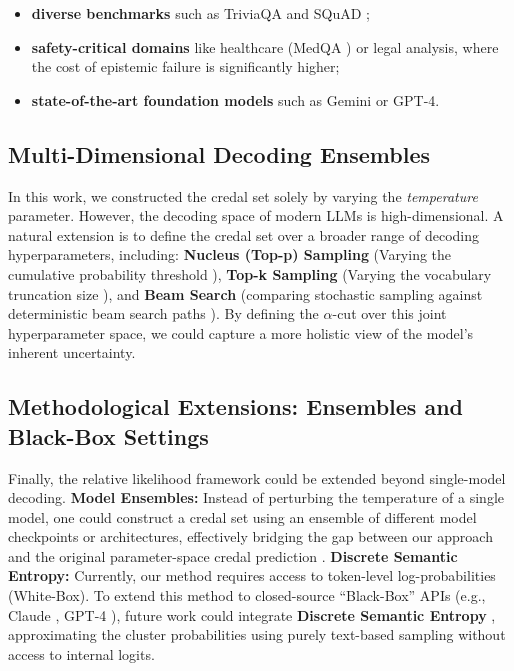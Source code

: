 \begin{itemize}
    \item \textbf{diverse benchmarks} such as TriviaQA 
	\parencite{joshi2017triviaqalargescaledistantly} and 
	SQuAD \parencite{rajpurkar2018knowdontknowunanswerable};
    \item \textbf{safety-critical domains} like healthcare 
	(MedQA \citealp{jin2020diseasedoespatienthave}) or legal 
	analysis, where the cost of epistemic failure is significantly 
	higher;
    \item \textbf{state-of-the-art foundation models} such as Gemini 
	\parencite{geminiteam2025geminifamilyhighlycapable} or 
	GPT-4.
\end{itemize}

\subsection{Multi-Dimensional Decoding Ensembles}
\label{sec:conclusion:future:decoding}
In this work, we constructed the credal set solely by varying the 
\textit{temperature} parameter. However, the decoding space of modern 
LLMs is high-dimensional. A natural extension is to define the credal 
set over a broader range of decoding hyperparameters, including:
\textbf{Nucleus (Top-p) Sampling} (Varying the cumulative 
probability threshold \parencite{holtzman2020curiouscaseneuraltext}),
\textbf{Top-k Sampling} (Varying the vocabulary truncation size 
\parencite{fan2018hierarchicalneuralstorygeneration}), and
\textbf{Beam Search} (comparing stochastic sampling against deterministic 
beam search paths \parencite{freitag-al-onaizan-2017-beam}).
By defining the $\alpha$-cut over this joint hyperparameter space, we 
could capture a more holistic view of the model's inherent uncertainty.

\subsection{Methodological Extensions: Ensembles and Black-Box Settings}
\label{sec:conclusion:future:black_box}
Finally, the relative likelihood framework could be extended beyond 
single-model decoding.
\textbf{Model Ensembles:} Instead of perturbing the temperature of a 
single model, one could construct a credal set using an ensemble of 
different model checkpoints or architectures, effectively bridging 
the gap between our approach and the original parameter-space credal 
prediction \parencite{löhr2025credalpredictionbasedrelative}.
\textbf{Discrete Semantic Entropy:} Currently, our method requires 
access to token-level log-probabilities (White-Box). To extend this 
method to closed-source ``Black-Box'' APIs (e.g., Claude 
\parencite{claude3}, GPT-4 \parencite{openai2024gpt4technicalreport}), 
future work could integrate \textbf{Discrete Semantic Entropy} 
\parencite{kuhn2024semanticentropy}, approximating the cluster 
probabilities using purely text-based sampling without access to 
internal logits.
